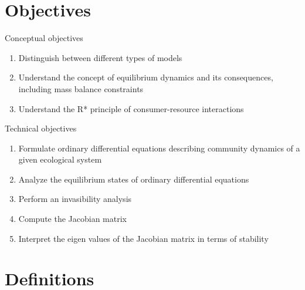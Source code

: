 \documentclass{eecslides}
\begin{document}

	\section{Objectives}

	\begin{frame}{Conceptual objectives}

	\begin{enumerate}
		\item Distinguish between different types of models
		\item Understand the concept of equilibrium dynamics and its consequences, including mass balance constraints
		\item Understand the R* principle of consumer-resource interactions
	\end{enumerate}

	\end{frame}


	\begin{frame}{Technical objectives}

	\begin{enumerate}
		\item Formulate ordinary differential equations describing community dynamics of a given ecological system
		\item Analyze the equilibrium states of ordinary differential equations
		\item Perform an invasibility analysis
		\item Compute the Jacobian matrix
		\item Interpret the eigen values of the Jacobian matrix in terms of stability
	\end{enumerate}

	\end{frame}


	\section{Definitions}
\end{document}
